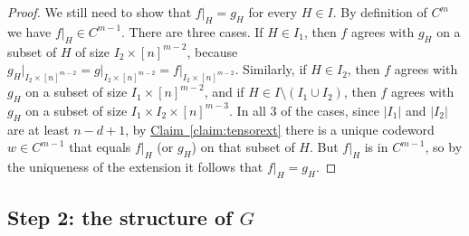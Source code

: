 \documentclass[11pt]{article}
\numberwithin{equation}{section}
\theoremstyle{definition}
\theoremstyle{plain}
\newcommand{\expref}[2]{\hyperref[#2]{#1~\ref{#2}}}
\theoremstyle{plain}
\newcommand{\colored}{}
\newcommand{\plane}{{\colored{H}}} %
\newcommand{\codedist}{\colored{d}} %
\newcommand{\blocklength}{\colored{n}} %
\newcommand{\closestlocalword}[1]{ \colored{g_{#1}}} %
\newcommand{\closestglobalword}{\colored{f}} %
\newcommand{\word}{\colored{w}}
\newcommand\abs[1]{\colored{\left|#1\right|}}
\begin{document}
\begin{proof}
We still need to show that $\closestglobalword \vert_{\plane} = \closestlocalword{\plane}$ for every $\plane \in I$. By definition of $C^m$ we have $\closestglobalword \vert_{\plane} \in C^{m-1}$. There are three cases. If $\plane \in I_1$, then $\closestglobalword$ agrees with $\closestlocalword{\plane}$ on a subset of $\plane$ of size $I_2 \times [\blocklength]^{m-2}$, because $\closestlocalword{\plane} \vert_{I_2 \times [\blocklength]^{m-2}} = g \vert_{I_2 \times [\blocklength]^{m-2}} = \closestglobalword \vert_{I_2 \times [\blocklength]^{m-2}}$. Similarly, if $\plane \in I_2$, then $\closestglobalword$ agrees with $\closestlocalword{\plane}$ on a subset of size $I_1 \times [\blocklength]^{m-2}$, and if $\plane \in I \setminus (I_1 \cup I_2)$, then $\closestglobalword$ agrees with $\closestlocalword{\plane}$ on a subset of size $I_1 \times I_2 \times [\blocklength]^{m-3}$.
In all $3$ of the cases, since $\abs{I_1}$ and $\abs{I_2}$ are at least $\blocklength - \codedist + 1$, by
\expref{Claim}{claim:tensorext} there is a unique codeword $\word \in C^{m-1}$ that equals $\closestglobalword \vert_{\plane}$ (or $\closestlocalword{\plane}$) on that subset of $\plane$. But $\closestglobalword \vert_{\plane}$ is in $C^{m-1}$, so by the uniqueness of the extension it follows that $\closestglobalword \vert_{\plane} = \closestlocalword{\plane}$.
\end{proof}

%
%
\subsection{Step 2: the structure of \texorpdfstring{$G$}{G}}
\end{document}
